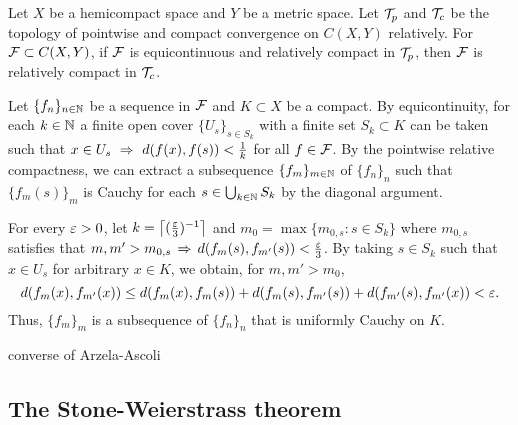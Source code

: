 \documentclass{../crs}
\begin{document}
\begin{thm}
Let $X$ be a hemicompact space and $Y$ be a metric space.
Let $\mathcal{T}_p$ and $\mathcal{T}_c$ be the topology of pointwise and compact convergence on $C(X,Y)$ relatively.
For $\mathcal{F}\subset C(X,Y)$, if $\mathcal{F}$ is equicontinuous and relatively compact in $\mathcal{T}_p$, then $\mathcal{F}$ is relatively compact in $\mathcal{T}_c$.
\end{thm}
\begin{pf}
Let $\{f_n\}_{n\in\mathbb{N}}$ be a sequence in $\mathcal{F}$ and $K\subset X$ be a compact.
By equicontinuity, for each $k\in\mathbb{N}$ a finite open cover $\{U_s\}_{s\in S_k}$ with a finite set $S_k\subset K$ can be taken such that $x\in U_s\,\impl\,d(f(x),f(s))<\frac1k$ for all $f\in\mathcal{F}$.
By the pointwise relative compactness, we can extract a subsequence $\{f_m\}_{m\in\mathbb{N}}$ of $\{f_n\}_n$ such that $\{f_m(s)\}_m$ is Cauchy for each $s\in\bigcup_{k\in\mathbb{N}}S_k$ by the diagonal argument.

For every $\varepsilon>0$, let $k=\left\lceil(\frac{\varepsilon}3)^{-1}\right\rceil$ and $m_0=\max\{m_{0,s}:s\in S_k\}$ where $m_{0,s}$ satisfies that $m,m'>m_{0,s}\impl d(f_m(s),f_{m'}(s))<\frac\e3$.
By taking $s\in S_k$ such that $x\in U_s$ for arbitrary $x\in K$, we obtain, for $m,m'>m_0$,
\[d(f_m(x),f_{m'}(x))\le d(f_m(x),f_m(s))+d(f_m(s),f_{m'}(s))+d(f_{m'}(s),f_{m'}(x))<\varepsilon.\]
Thus, $\{f_m\}_m$ is a subsequence of $\{f_n\}_n$ that is uniformly Cauchy on $K$.
\end{pf}


converse of Arzela-Ascoli




\subsection{The Stone-Weierstrass theorem}
\end{document}
